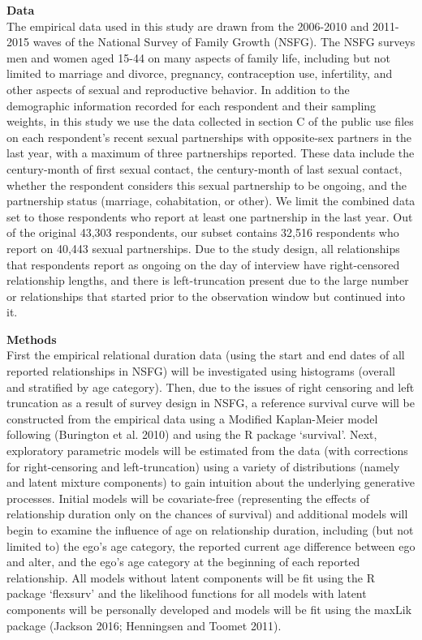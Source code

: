 \documentclass [11pt, proquest] {uwthesis}[2015/03/03]
\begin{document}
\textbf{Data}\\
The empirical data used in this study are drawn from the 2006-2010 and
2011-2015 waves of the National Survey of Family Growth (NSFG). The NSFG
surveys men and women aged 15-44 on many aspects of family life,
including but not limited to marriage and divorce, pregnancy,
contraception use, infertility, and other aspects of sexual and
reproductive behavior. In addition to the demographic information
recorded for each respondent and their sampling weights, in this study
we use the data collected in section C of the public use files on each
respondent's recent sexual partnerships with opposite-sex partners in
the last year, with a maximum of three partnerships reported. These data
include the century-month of first sexual contact, the century-month of
last sexual contact, whether the respondent considers this sexual
partnership to be ongoing, and the partnership status (marriage,
cohabitation, or other). We limit the combined data set to those
respondents who report at least one partnership in the last year. Out of
the original 43,303 respondents, our subset contains 32,516 respondents
who report on 40,443 sexual partnerships. Due to the study design, all
relationships that respondents report as ongoing on the day of interview
have right-censored relationship lengths, and there is left-truncation
present due to the large number or relationships that started prior to
the observation window but continued into it.

\textbf{Methods}\\
First the empirical relational duration data (using the start and end
dates of all reported relationships in NSFG) will be investigated using
histograms (overall and stratified by age category). Then, due to the
issues of right censoring and left truncation as a result of survey
design in NSFG, a reference survival curve will be constructed from the
empirical data using a Modified Kaplan-Meier model following (Burington
et al. 2010) and using the R package `survival'. Next, exploratory
parametric models will be estimated from the data (with corrections for
right-censoring and left-truncation) using a variety of distributions
(namely and latent mixture components) to gain intuition about the
underlying generative processes. Initial models will be covariate-free
(representing the effects of relationship duration only on the chances
of survival) and additional models will begin to examine the influence
of age on relationship duration, including (but not limited to) the
ego's age category, the reported current age difference between ego and
alter, and the ego's age category at the beginning of each reported
relationship. All models without latent components will be fit using the
R package `flexsurv' and the likelihood functions for all models with
latent components will be personally developed and models will be fit
using the maxLik package (Jackson 2016; Henningsen and Toomet 2011).
\end{document}
